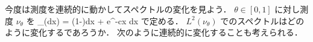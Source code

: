\begin{comment}
\begin{center}
\begin{pspicture}(-1,-4)(5,3) %
\psset{arrowsize=3pt 2, arrowlength=1.5}
\psset{xunit=8mm, yunit=12mm}
\psaxes[labels=y,showorigin=true,linewidth=.2pt,ticks=none]{->}(0,0)(-1,-2)(4.5,2)
\psset{linewidth=1pt,arrows=c-c,linecolor=red}
\pscurve(4,2)(0,0)(4,-2)
\uput{5pt}[45](1,-3){w.r.t. $\nu_0=dx$}

\end{pspicture} 
%
\begin{pspicture}(-1,-4)(5,3) %
\psset{arrowsize=3pt 2, arrowlength=1.5}
\psset{xunit=8mm, yunit=12mm}
\psaxes[labels=none,showorigin=true,linewidth=.2pt,ticks=none]{->}(0,0)(-1,-2)(4.5,2)
\psset{linewidth=1pt,arrows=c-c,linecolor=red}
\psline(.5,0)(4.2,0)


\uput[90](.5,0){$\ds \frac{c^2}{4}$}
\uput{5pt}[45](1,-3){w.r.t. $\nu_1=e^{-cx}dx$}
\end{pspicture} 
\end{center}
\end{comment}


今度は測度を連続的に動かしてスペクトルの変化を見よう．
$\theta\in[0,1]$ に対し測度 $\nu_\theta$ を
\bdn %
\nu_\theta(dx) = (1-\theta)dx  + \theta e^{-cx} dx
\edn %
で定める．
$L^2(\nu_\theta)$ でのスペクトルはどのように変化するであろうか．
次のように連続的に変化することも考えられる．

\begin{center}
\end{center}

\begin{comment}
\begin{center}
\begin{pspicture}(-1,-4)(5,3) %
\psset{arrowsize=3pt 2, arrowlength=1.5}
\psset{xunit=8mm, yunit=12mm}
\psaxes[labels=y,showorigin=true,linewidth=.2pt,ticks=none]{->}(0,0)(-1,-2)(4.5,2)
\psset{linewidth=1pt,arrows=c-c,linecolor=red}
\psline(.5,0)(4.2,0)
\pscurve(4,2)(0,0)(4,-2)
\pscurve[linecolor=blue](4,.9)(.25,0)(4,-.9)
\psline[linecolor=black]{->}(2.3,1.2)(3.1,.3)
\uput{5pt}[45](1,-3){w.r.t. $\nu_\theta$}
\uput[45](2.5,1){?}

\end{pspicture} 
\end{center}
\end{comment}

